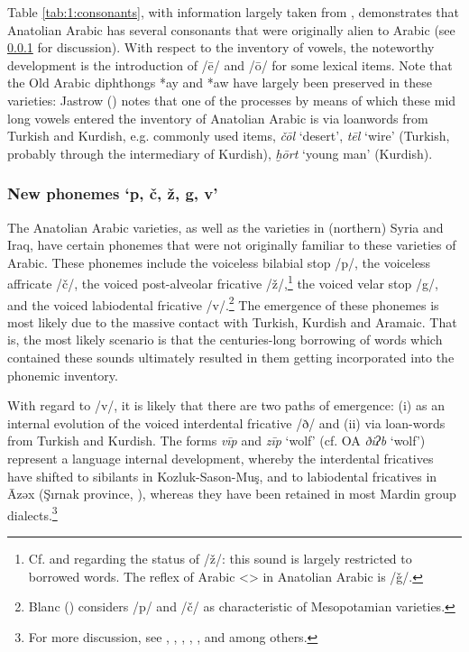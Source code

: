 \documentclass[output=paper]{langsci/langscibook}
\begin{document}
Table \ref{tab:1:consonants}, with information largely taken from \cite{Jastrow2011anatolian}, demonstrates that Anatolian Arabic has several consonants that were originally alien to Arabic (see \ref{newsounds} for discussion). With respect to the inventory of vowels, the noteworthy development is the introduction of /\={e}/ and /\={o}/ for some lexical items. Note that the Old Arabic diphthongs *ay and *aw have largely been preserved in these varieties: Jastrow (\citeyear[89]{Jastrow2011anatolian}) notes that one of the processes by means of which these mid long vowels entered the inventory of Anatolian Arabic is via loanwords from Turkish and Kurdish, e.g. commonly used items, \textit{\v{c}\={o}l} `desert', \textit{t\={e}l} `wire' (Turkish, probably through the intermediary of Kurdish), \textit{ḫ\={o}rt} `young man' (Kurdish).  


\subsubsection{New phonemes `p, \v{c}, ž, g, v'}\label{newsounds}
The Anatolian Arabic varieties, as well as the varieties in (northern) Syria and Iraq, have certain phonemes that were not originally familiar to these varieties of Arabic. These phonemes include the voiceless bilabial stop /p/, the voiceless affricate /\v{c}/, the voiced post-alveolar fricative /ž/,\footnote{Cf. \cite{Jastrow2011anatolian} and \cite{GrigoreBituna2012} regarding the status of /ž/: this sound is largely restricted to borrowed words. The reflex of Arabic <{}> in Anatolian Arabic is /\v{g}/.} the voiced velar stop /g/, and the voiced labiodental fricative /v/.\footnote{Blanc (\citeyear[6--7]{Blanc1964}) considers /p/ and /\v{c}/ as characteristic of Mesopotamian varieties.} The emergence of these phonemes is most likely due to the massive contact with Turkish, Kurdish and Aramaic. That is, the most likely scenario is that the centuries-long borrowing of words which contained these sounds ultimately resulted in them getting incorporated into the phonemic inventory. 


With regard to /v/, it is likely that there are two paths of emergence: (i) as an internal evolution of the voiced interdental fricative /ð/ and (ii) via loan-words from Turkish and Kurdish. The forms \textit{vīp} and \textit{zīp} `wolf' (cf. OA \textit{ðiʔb} `wolf') represent a language internal development, whereby the interdental fricatives have shifted to sibilants in Kozluk-Sason-Mu\c{s}, and to labiodental fricatives in \={A}zəx (\c{S}{\i}rnak province, \citealt{Wittrich2001}), whereas they have been retained in most Mardin group dialects.\footnote{For more discussion, see \citet{Wittrich2001}, \citet{Jastrow2011anatolian}, \citet{Grigore2007article}, \citet{Talay2011}, \citet{Akkus2017}, and \cite{Bituna2016} among others. } 
\end{document}
